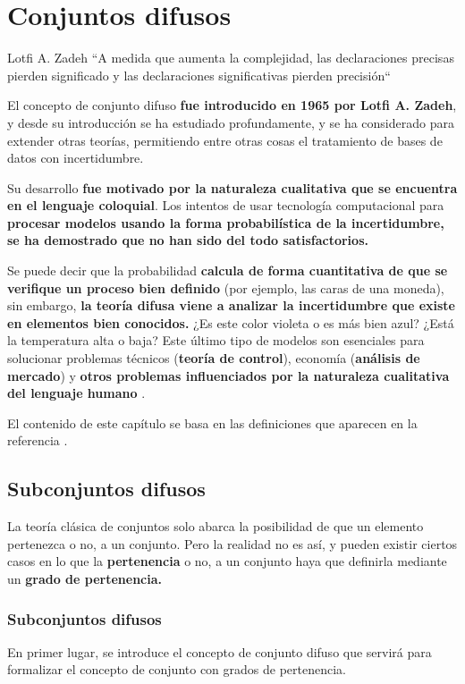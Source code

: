 
\chapter{Conjuntos difusos}
\begin{chapquote}{Lotfi A. Zadeh}
	``A medida que aumenta la complejidad, las declaraciones precisas pierden significado y las declaraciones significativas pierden precisión``
\end{chapquote}
El concepto de conjunto difuso \textbf{fue introducido en 1965 por Lotfi A. Zadeh}, y desde su introducción se ha estudiado profundamente, y se ha considerado para extender otras teorías, permitiendo entre otras cosas el tratamiento de bases de datos con incertidumbre.

Su desarrollo \textbf{fue motivado por la naturaleza cualitativa que se encuentra en el lenguaje coloquial}. Los intentos de usar tecnología computacional para \textbf{procesar modelos usando la forma probabilística de la incertidumbre, se ha demostrado que no han sido del todo satisfactorios.}

Se puede decir que la probabilidad \textbf{calcula de forma cuantitativa de que se verifique un proceso bien definido} (por ejemplo, las caras de una moneda), sin embargo, \textbf{la teoría difusa viene a analizar la incertidumbre que existe en elementos bien conocidos.} ¿Es este color violeta o es más bien azul? ¿Está la temperatura alta o baja? Este último tipo de modelos son esenciales para solucionar problemas técnicos (\textbf{teoría de control}), economía (\textbf{análisis de mercado}) y \textbf{otros problemas influenciados por la naturaleza cualitativa del lenguaje humano} \cite{historiafuzzy}.

El contenido de este capítulo se basa en las definiciones que aparecen en la referencia \cite{fuzzyintro}.

\section{Subconjuntos difusos}
La teoría clásica de conjuntos solo abarca la posibilidad de que un elemento pertenezca o no, a un conjunto. Pero la realidad no es así, y pueden existir ciertos casos en lo que la \textbf{pertenencia} o no, a un conjunto haya que definirla mediante un \textbf{grado de pertenencia.}

\subsection{Subconjuntos difusos}
En primer lugar, se introduce el concepto de conjunto difuso que servirá para formalizar el concepto de conjunto con grados de pertenencia.

